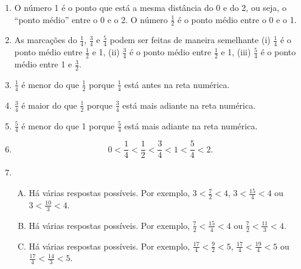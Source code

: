\begin{solucao}{}{}

\begin{center}
\end{center}


\begin{enumerate} [\quad a)] %
    \item      O número 1 é o ponto que está a mesma distância do 0 e do 2, ou seja, o ``ponto médio'' entre o 0 e o 2. O número $\frac{1}{2}$ é o ponto médio entre o 0 e o 1.

\item  As marcações do $\frac{1}{4}$, $\frac{3}{4}$ e $\frac{5}{4}$ podem ser feitas de maneira semelhante (i) $\frac{1}{4}$ é o ponto médio entre $\frac{1}{2}$ e 1, (ii) $\frac{3}{4}$ é o ponto médio entre $\frac{1}{2}$ e 1, (iii) $\frac{5}{4}$ é o ponto médio entre 1 e $\frac{3}{2}$.
    \item       $\frac{1}{4}$       é menor do que       $\frac{1}{2}$       porque $\frac{1}{4}$ está antes na reta numérica.
    \item       $\frac{3}{4}$       é maior do que        $\frac{1}{2}$       porque $\frac{3}{4}$ está mais adiante na reta numérica.
    \item       $\frac{5}{4}$       é menor do que 1 porque $\frac{5}{4}$ está mais adiante na reta numérica.
    \item       $$0 < \frac{1}{4} < \frac{1}{2}< \frac{3}{4} < 1 < \frac{5}{4} < 2.$$
    \item \mbox{ }
      
      \begin{enumerate}[A)]
    \item Há várias respostas possíveis. Por exemplo,       $3 < \frac{7}{2} < 4$,       $3 < \frac{15}{4} < 4$         ou         $3 < \frac{10}{3} < 4$.
    \item       Há várias respostas possíveis. Por exemplo,       $\frac{7}{2} < \frac{15}{4} < 4$ ou $\frac{7}{2} < \frac{11}{3} < 4$.
    \item       Há várias respostas possíveis. Por exemplo,       $\frac{17}{4} < \frac{9}{2} < 5$, $\frac{17}{4} < \frac{19}{4} < 5$ ou $\frac{17}{4} < \frac{14}{3} < 5$.
      \end{enumerate}
     
\end{enumerate} %


\end{solucao}






